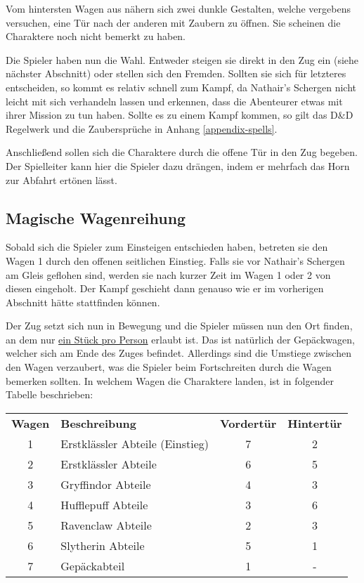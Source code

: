 \documentclass[]{scrartcl}
\begin{document}
Vom hintersten Wagen aus nähern sich zwei dunkle Gestalten, welche vergebens versuchen, eine Tür nach der anderen mit Zaubern zu öffnen. Sie scheinen die Charaktere noch nicht bemerkt zu haben.


Die Spieler haben nun die Wahl. Entweder steigen sie direkt in den Zug ein (siehe nächster Abschnitt) oder stellen sich den Fremden. Sollten sie sich für letzteres entscheiden, so kommt es relativ schnell zum Kampf, da Nathair's Schergen nicht leicht mit sich verhandeln lassen und erkennen, dass die Abenteurer etwas mit ihrer Mission zu tun haben. Sollte es zu einem Kampf kommen, so gilt das D\&D Regelwerk und die Zaubersprüche in Anhang \ref{appendix-spells}.

Anschließend sollen sich die Charaktere durch die offene Tür in den Zug begeben. Der Spielleiter kann hier die Spieler dazu drängen, indem er mehrfach das Horn zur Abfahrt ertönen lässt.

\subsection{Magische Wagenreihung}

Sobald sich die Spieler zum Einsteigen entschieden haben, betreten sie den Wagen 1 durch den offenen seitlichen Einstieg. Falls sie vor Nathair's Schergen am Gleis geflohen sind, werden sie nach kurzer Zeit im Wagen 1 oder 2 von diesen eingeholt. Der Kampf geschieht dann genauso wie er im vorherigen Abschnitt hätte stattfinden können.

Der Zug setzt sich nun in Bewegung und die Spieler müssen nun den Ort finden, an dem nur \underline{ein Stück pro Person} erlaubt ist. Das ist natürlich der Gepäckwagen, welcher sich am Ende des Zuges befindet. Allerdings sind die Umstiege zwischen den Wagen verzaubert, was die Spieler beim Fortschreiten durch die Wagen bemerken sollten. In welchem Wagen die Charaktere landen, ist in folgender Tabelle beschrieben:\\

\begin{center}
	\begin{tabularx}{0.8\linewidth}{clcc}
		\textbf{Wagen} & \textbf{Beschreibung} & \textbf{Vordertür} & \textbf{Hintertür}\\
		1 & Erstklässler Abteile (Einstieg) & 7 & 2\\
		2 & Erstklässler Abteile & 6 & 5\\
		3 & Gryffindor Abteile & 4 & 3\\
		4 & Hufflepuff Abteile & 3 & 6\\
		5 & Ravenclaw Abteile & 2 & 3\\
		6 & Slytherin Abteile & 5 & 1\\
		7 & Gepäckabteil & 1 & -
	\end{tabularx}
\end{center}
\end{document}
